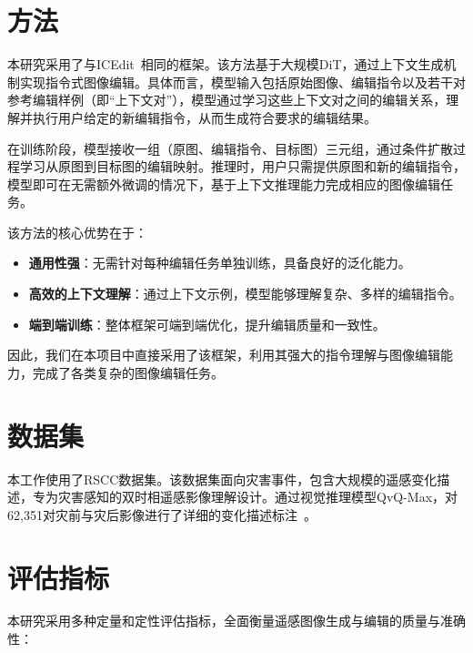 \documentclass[12pt,a4paper]{article}
\begin{document}
\section{方法}
本研究采用了与ICEdit~\parencite{zhangInContextEditEnabling2025}相同的框架。该方法基于大规模DiT，通过上下文生成机制实现指令式图像编辑。具体而言，模型输入包括原始图像、编辑指令以及若干对参考编辑样例（即“上下文对”），模型通过学习这些上下文对之间的编辑关系，理解并执行用户给定的新编辑指令，从而生成符合要求的编辑结果。

在训练阶段，模型接收一组（原图、编辑指令、目标图）三元组，通过条件扩散过程学习从原图到目标图的编辑映射。推理时，用户只需提供原图和新的编辑指令，模型即可在无需额外微调的情况下，基于上下文推理能力完成相应的图像编辑任务。

该方法的核心优势在于：
\begin{itemize}
    \item \textbf{通用性强}：无需针对每种编辑任务单独训练，具备良好的泛化能力。
    \item \textbf{高效的上下文理解}：通过上下文示例，模型能够理解复杂、多样的编辑指令。
    \item \textbf{端到端训练}：整体框架可端到端优化，提升编辑质量和一致性。
\end{itemize}

因此，我们在本项目中直接采用了该框架，利用其强大的指令理解与图像编辑能力，完成了各类复杂的图像编辑任务。

\section{数据集}
本工作使用了RSCC数据集。该数据集面向灾害事件，包含大规模的遥感变化描述，专为灾害感知的双时相遥感影像理解设计。通过视觉推理模型QvQ-Max，对62,351对灾前与灾后影像进行了详细的变化描述标注~\parencite{chenRSCC2025}。

\section{评估指标}

本研究采用多种定量和定性评估指标，全面衡量遥感图像生成与编辑的质量与准确性：
\end{document}
